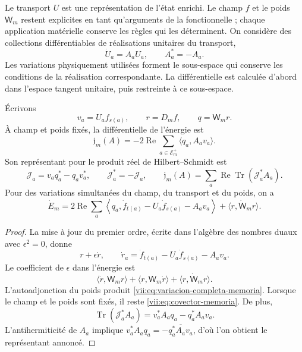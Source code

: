 Le transport \(U\) est une représentation de l'état enrichi. Le champ \(f\) et le poids \(\mathsf W_m\) restent explicites en tant qu'arguments de la fonctionnelle ; chaque application matérielle conserve les règles qui les déterminent. On considère des collections différentiables de réalisations unitaires du transport,
\[
 \dot U_a=A_aU_a,\qquad A_a^*=-A_a.
\]
Les variations physiquement utilisées forment le sous-espace qui conserve
les conditions de la réalisation correspondante. La différentielle est
calculée d'abord dans l'espace tangent unitaire, puis restreinte
à ce sous-espace.

\begin{proposition}
\label{vii:prop:covector-memoria}
Écrivons
\[
 v_a=U_af_{s(a)},\qquad r=D_mf,\qquad q=\mathsf W_mr.
\]
À champ et poids fixés, la différentielle de l'énergie est
\begin{equation}
 \mathfrak j_m(A)=-2\operatorname{Re}
       \sum_{a\in\mathcal E_m^+}\langle q_a,A_av_a\rangle .
 \label{vii:eq:covector-memoria}
\end{equation}
Son représentant pour le produit réel de Hilbert--Schmidt est
\begin{equation}
 \mathcal J_a=v_aq_a^*-q_av_a^*,\qquad
 \mathcal J_a^*=-\mathcal J_a,\qquad
 \mathfrak j_m(A)=
 \sum_a\operatorname{Re}\operatorname{Tr}(\mathcal J_a^*A_a).
 \label{vii:eq:representante-corriente-discreta}
\end{equation}
Pour des variations simultanées du champ, du transport et du poids, on a
\begin{equation}
 \dot E_m=
 2\operatorname{Re}\sum_a
 \left\langle q_a,\dot f_{t(a)}-U_a\dot f_{s(a)}-A_av_a\right\rangle
 +\langle r,\dot{\mathsf W}_mr\rangle .
 \label{vii:eq:variacion-completa-memoria}
\end{equation}
\end{proposition}

\begin{proof}
La mise à jour du premier ordre, écrite dans l'algèbre des nombres duaux avec \(\epsilon^2=0\), donne
\[
 r+\epsilon\dot r,\qquad
 \dot r_a=\dot f_{t(a)}-U_a\dot f_{s(a)}-A_av_a.
\]
Le coefficient de \(\epsilon\) dans l'énergie est
\[
 \langle\dot r,\mathsf W_mr\rangle+
 \langle r,\mathsf W_m\dot r\rangle+
 \langle r,\dot{\mathsf W}_mr\rangle.
\]
L'autoadjonction du poids produit
\eqref{vii:eq:variacion-completa-memoria}. Lorsque le champ et le poids sont fixés, il reste
\eqref{vii:eq:covector-memoria}. De plus,
\[
 \operatorname{Tr}(\mathcal J_a^*A_a)
 =v_a^*A_aq_a-q_a^*A_av_a.
\]
L'antihermiticité de \(A_a\) implique
\(v_a^*A_aq_a=-\overline{q_a^*A_av_a}\), d'où l'on obtient
le représentant annoncé.
\end{proof}

